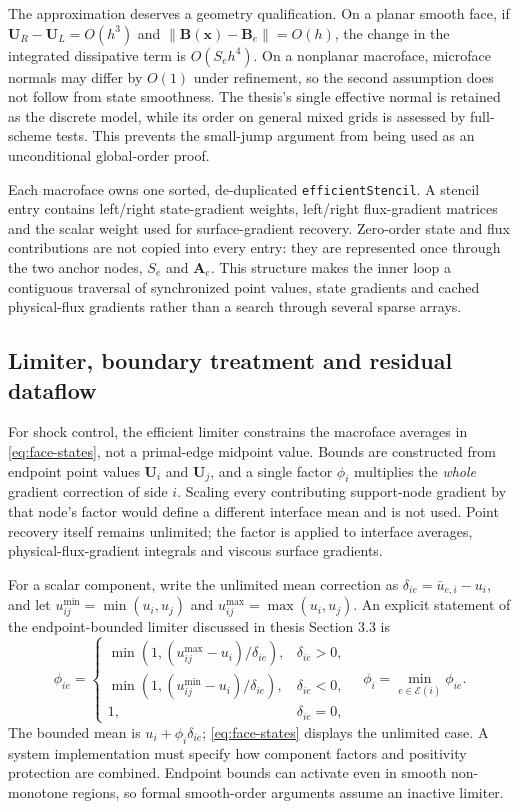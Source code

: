 \documentclass[11pt]{article}
\newcommand{\U}{\bm{U}}
\begin{document}
The approximation deserves a geometry qualification.  On a planar smooth face, if $\U_R-\U_L=O(h^3)$ and $\|\bm B(\bm x)-\bm B_e\|=O(h)$, the change in the integrated dissipative term is $O(S_eh^4)$.  On a nonplanar macroface, microface normals may differ by $O(1)$ under refinement, so the second assumption does not follow from state smoothness.  The thesis's single effective normal is retained as the discrete model, while its order on general mixed grids is assessed by full-scheme tests.  This prevents the small-jump argument from being used as an unconditional global-order proof.

Each macroface owns one sorted, de-duplicated \texttt{efficientStencil}.  A stencil entry contains left/right state-gradient weights, left/right flux-gradient matrices and the scalar weight used for surface-gradient recovery.  Zero-order state and flux contributions are not copied into every entry: they are represented once through the two anchor nodes, $S_e$ and $\bm A_e$.  This structure makes the inner loop a contiguous traversal of synchronized point values, state gradients and cached physical-flux gradients rather than a search through several sparse arrays.

\subsection{Limiter, boundary treatment and residual dataflow}\label{sec:runtime}

For shock control, the efficient limiter constrains the macroface averages in \eqref{eq:face-states}, not a primal-edge midpoint value.  Bounds are constructed from endpoint point values $\U_i$ and $\U_j$, and a single factor $\phi_i$ multiplies the \emph{whole} gradient correction of side $i$.  Scaling every contributing support-node gradient by that node's factor would define a different interface mean and is not used.  Point recovery itself remains unlimited; the factor is applied to interface averages, physical-flux-gradient integrals and viscous surface gradients.

For a scalar component, write the unlimited mean correction as $\delta_{ie}=\bar u_{e,i}-u_i$, and let $u^{\min}_{ij}=\min(u_i,u_j)$ and $u^{\max}_{ij}=\max(u_i,u_j)$.  An explicit statement of the endpoint-bounded limiter discussed in thesis Section 3.3 \cite{ma2026thesis} is
\begin{equation}
 \phi_{ie}=
 \begin{cases}
  \min(1,(u^{\max}_{ij}-u_i)/\delta_{ie}),&\delta_{ie}>0,\\
  \min(1,(u^{\min}_{ij}-u_i)/\delta_{ie}),&\delta_{ie}<0,\\
  1,&\delta_{ie}=0,
 \end{cases}
 \quad \phi_i=\min_{e\in\mathcal E(i)}\phi_{ie}.
 \label{eq:limiter-explicit}
\end{equation}
The bounded mean is $u_i+\phi_i\delta_{ie}$; \eqref{eq:face-states} displays the unlimited case.  A system implementation must specify how component factors and positivity protection are combined.  Endpoint bounds can activate even in smooth non-monotone regions, so formal smooth-order arguments assume an inactive limiter.
\end{document}
